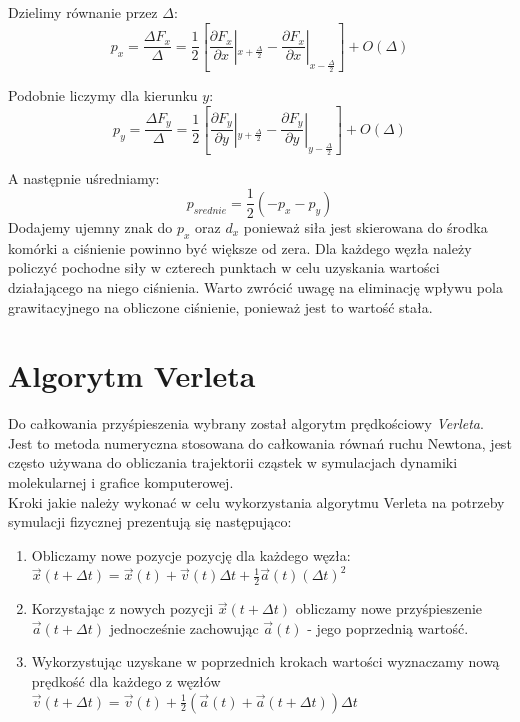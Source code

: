 \documentclass[12pt, letterpaper]{report}
\begin{document}
    Dzielimy równanie przez $\Delta$:
    \begin{equation}
        p_x = \frac{\Delta F_x}{\Delta} = \frac{1}{2} 
        \left[ \frac{\partial F_x}{\partial x} |_{x + \frac{\Delta}{2}} - \frac{\partial F_x}{\partial x} |_{x - \frac{\Delta}{2}} \right] + O(\Delta)
    \end{equation}

    Podobnie liczymy dla kierunku $y$:
    \begin{equation}
        p_y = \frac{\Delta F_y}{\Delta} = \frac{1}{2} 
        \left[ \frac{\partial F_y}{\partial y} |_{y + \frac{\Delta}{2}} - \frac{\partial F_y}{\partial y} |_{y - \frac{\Delta}{2}} \right] + O(\Delta)
    \end{equation}

    A następnie uśredniamy:
    \begin{equation}
        p_{srednie} = \frac{1}{2} \left( -p_x - p_y \right)
    \end{equation}
    Dodajemy ujemny znak do $p_x$ oraz $d_x$ ponieważ siła jest skierowana do środka komórki a 
    ciśnienie powinno być większe od zera. Dla każdego węzła należy policzyć pochodne siły w czterech punktach w celu 
    uzyskania wartości działającego na niego ciśnienia. Warto zwrócić uwagę na eliminację wpływu 
    pola grawitacyjnego na obliczone ciśnienie, ponieważ jest to wartość stała.

    \clearpage
    \section{Algorytm Verleta}
    Do całkowania przyśpieszenia wybrany został algorytm prędkościowy \emph{Verleta}. 
    Jest to metoda numeryczna stosowana do całkowania równań ruchu Newtona,
    jest często używana do obliczania trajektorii cząstek w symulacjach 
    dynamiki molekularnej i grafice komputerowej. \\
    
    Kroki jakie należy wykonać w celu wykorzystania algorytmu Verleta na 
    potrzeby symulacji fizycznej prezentują się następująco:
    \begin{enumerate}
        \item Obliczamy nowe pozycje pozycję dla każdego węzła: 
        $\vec{x}(t + \Delta t) = \vec{x}(t) + \vec{v}(t) \Delta t + \frac{1}{2} \vec{a}(t) (\Delta t)^2$

        \item Korzystając z nowych pozycji $\vec{x}(t + \Delta t)$ obliczamy nowe 
        przyśpieszenie $\vec{a}(t + \Delta t)$ jednocześnie 
        zachowując $\vec{a}(t)$ - jego poprzednią wartość.

        \item Wykorzystując uzyskane w poprzednich krokach wartości wyznaczamy nową prędkość dla każdego z węzłów 
        $\vec{v}(t + \Delta t) = \vec{v}(t) + \frac{1}{2} \left( \vec{a}(t) + \vec{a}(t + \Delta t) \right) \Delta t$
    \end{enumerate}
\end{document}
